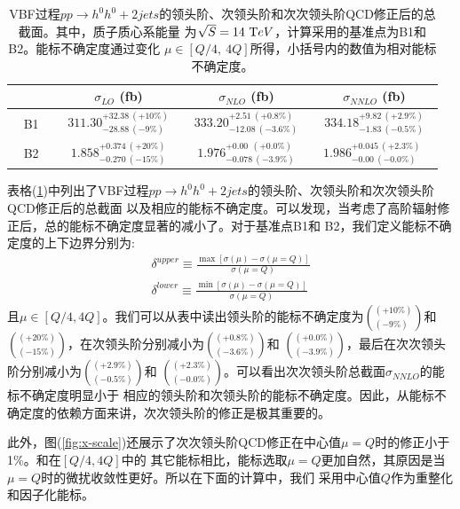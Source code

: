 \begin{table}
  \centering
  \begin{tabular}{|c|c|c|c|}
   \hline\hline
     ~~~~~ & $\sigma_{LO}$ (fb) & $\sigma_{NLO}$ (fb) & $\sigma_{NNLO}$ (fb) \\
    \hline
    B1 &   ~$311.30^{+32.38~(+10\%)}_{-28.88~(-9\%)}$~     &  ~$333.20^{+2.51~(+0.8\%)}_{-12.08~(-3.6\%)}$~   &   ~$334.18^{+9.82~(+2.9\%)}_{-1.83~(-0.5\%)}$~ \\
    B2 &   ~$1.858^{+0.374~(+20\%)}_{-0.270~(-15\%)}$~     &  ~$1.976^{+0.00~~(+0.0\%)}_{-0.078~(-3.9\%)}$~   &   ~$1.986^{+0.045~(+2.3\%)}_{-0.00~(-0.0\%)}$ ~ \\
    \hline\hline
  \end{tabular}
\caption{VBF过程$pp\to h^0h^0+2jets$的领头阶、次领头阶和次次领头阶QCD修正后的总截面。其中，质子质心系能量
为$\sqrt{S} = 14~{\textrm TeV}$，计算采用的基准点为B1和B2。能标不确定度通过变化
$\mu\in [Q/4,~ 4 Q]$所得，小括号内的数值为相对能标不确定度。} 
\label{tab:x-error}
\end{table}
表格(\ref{tab:x-error})中列出了VBF过程$pp\to h^0h^0+2jets$的领头阶、次领头阶和次次领头阶QCD修正后的总截面
以及相应的能标不确定度。可以发现，当考虑了高阶辐射修正后，总的能标不确定度显著的减小了。对于基准点B1和
B2，我们定义能标不确定度的上下边界分别为:
\begin{eqnarray}
\delta^{upper} \equiv \frac{\max \left[ \sigma(\mu) - \sigma(\mu=Q) \right]}{\sigma(\mu=Q)} 
\nonumber \\
\delta^{lower} \equiv \frac{\min \left[ \sigma(\mu) - \sigma(\mu=Q) \right]}{\sigma(\mu=Q)} 
\end{eqnarray}
且$\mu \in [Q/4, 4Q]$。我们可以从表中读出领头阶的能标不确定度为$\left(^{(+10\%)}_{(-9\%)}\right)$和
$\left(^{(+20\%)}_{(-15\%)}\right)$，在次领头阶分别减小为$\left(^{(+0.8\%)}_{(-3.6\%)}\right)$和
$\left(^{(+0.0\%)}_{(-3.9\%)}\right)$，最后在次次领头阶分别减小为$\left(^{(+2.9\%)}_{(-0.5\%)}\right)$和
$\left(^{(+2.3\%)}_{(-0.0\%)}\right)$。可以看出次次领头阶总截面$\sigma_{NNLO}$的能标不确定度明显小于
相应的领头阶和次领头阶的能标不确定度。因此，从能标不确定度的依赖方面来讲，次次领头阶的修正是极其重要的。

此外，图(\ref{fig:x-scale})还展示了次次领头阶QCD修正在中心值$\mu = Q$时的修正小于1\%。和在$[Q/4,4Q]$中的
其它能标相比，能标选取$\mu = Q$更加自然，其原因是当$\mu = Q$时的微扰收敛性更好。所以在下面的计算中，我们
采用中心值$Q$作为重整化和因子化能标。

